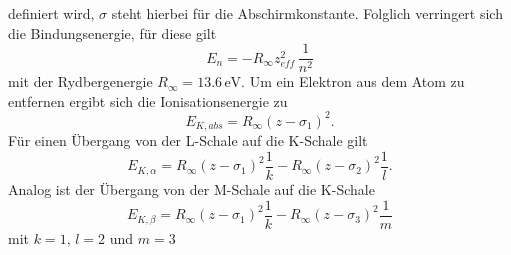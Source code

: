 definiert wird, $\sigma$ steht hierbei für die Abschirmkonstante.
Folglich verringert sich die Bindungsenergie, für diese gilt
\begin{equation}
    E_n = -R_{\infty} z_{eff}^2  \, \frac{1}{n^2}
\end{equation}
mit der Rydbergenergie $R_{\infty} = 13.6 \, \unit{\eV}$. Um ein Elektron aus 
dem Atom zu entfernen ergibt sich die Ionisationsenergie zu
\begin{equation}
    \label{eqn:a}
    E_{K,abs} = R_{\infty} (z - \sigma_1)^2.
\end{equation}
Für einen Übergang von der L-Schale auf die K-Schale gilt 
\begin{equation}
    \label{eqn:b}
    E_{K,\alpha} = R_{\infty} (z - \sigma_1)^2 \frac{1}{k} - R_{\infty} (z - \sigma_2)^2 \frac{1}{l}.
\end{equation}
Analog ist der Übergang von der M-Schale auf die K-Schale 
\begin{equation}
    \label{eqn:c}
    E_{K,\beta} = R_{\infty} (z - \sigma_1)^2 \frac{1}{k} - R_{\infty} (z - \sigma_3)^2 \frac{1}{m}
\end{equation}
mit $k = 1$, $l = 2$ und $m = 3$

